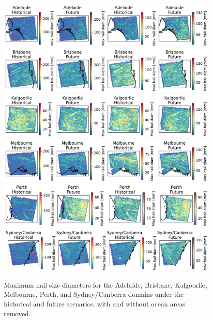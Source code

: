 \documentclass[draft,grl]{agutexSI2019}\usepackage[]{graphicx}\usepackage[]{xcolor}
\begin{document}
\begin{figure}[!ht]
    \includegraphics[width=\textwidth]{figures/maxes_Adelaide_hailcast_diam_max}
    \includegraphics[width=\textwidth]{figures/maxes_Brisbane_hailcast_diam_max}
    \includegraphics[width=\textwidth]{figures/maxes_Kalgoorlie_hailcast_diam_max}
    \includegraphics[width=\textwidth]{figures/maxes_Melbourne_hailcast_diam_max}
    \includegraphics[width=\textwidth]{figures/maxes_Perth_hailcast_diam_max}
    \includegraphics[width=\textwidth]{figures/maxes_Sydney_Canberra_hailcast_diam_max}
    \caption{Maximum hail size diameters for the Adelaide, Brisbane, Kalgoorlie, Melbourne, Perth, and Sydney/Canberra domains under the historical and future scenarios, with and without ocean areas removed.}
    \label{fig:maxes_with_removed_pts}
\end{figure}
\end{document}
